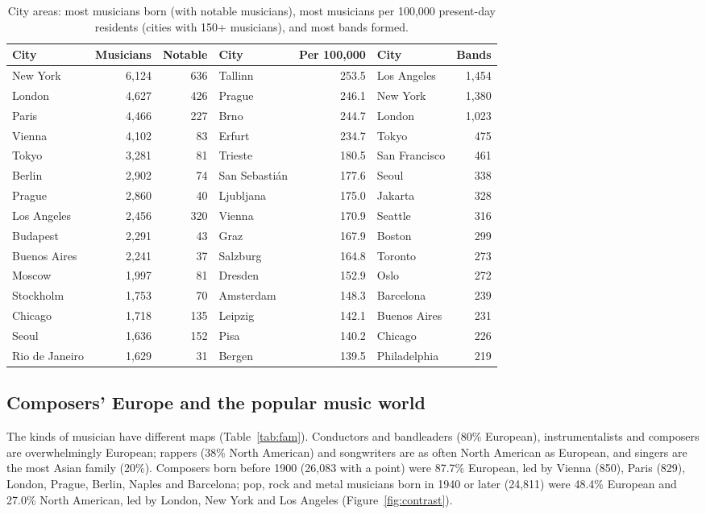 \documentclass[11pt,a4paper]{article}
\begin{document}
\begin{table}[tbp]\centering\small\caption{City areas: most musicians born (with notable musicians), most musicians per 100,000 present-day residents (cities with 150+ musicians), and most bands formed.}\label{tab:cities}\setlength{\tabcolsep}{5pt}\begin{tabular}{lrr@{\hspace{14pt}}lr@{\hspace{14pt}}lr}\toprule City & Musicians & Notable & City & Per 100,000 & City & Bands\\\midrule
New York & 6,124 & 636 & Tallinn & 253.5 & Los Angeles & 1,454\\
London & 4,627 & 426 & Prague & 246.1 & New York & 1,380\\
Paris & 4,466 & 227 & Brno & 244.7 & London & 1,023\\
Vienna & 4,102 & 83 & Erfurt & 234.7 & Tokyo & 475\\
Tokyo & 3,281 & 81 & Trieste & 180.5 & San Francisco & 461\\
Berlin & 2,902 & 74 & San Sebastián & 177.6 & Seoul & 338\\
Prague & 2,860 & 40 & Ljubljana & 175.0 & Jakarta & 328\\
Los Angeles & 2,456 & 320 & Vienna & 170.9 & Seattle & 316\\
Budapest & 2,291 & 43 & Graz & 167.9 & Boston & 299\\
Buenos Aires & 2,241 & 37 & Salzburg & 164.8 & Toronto & 273\\
Moscow & 1,997 & 81 & Dresden & 152.9 & Oslo & 272\\
Stockholm & 1,753 & 70 & Amsterdam & 148.3 & Barcelona & 239\\
Chicago & 1,718 & 135 & Leipzig & 142.1 & Buenos Aires & 231\\
Seoul & 1,636 & 152 & Pisa & 140.2 & Chicago & 226\\
Rio de Janeiro & 1,629 & 31 & Bergen & 139.5 & Philadelphia & 219\\
\bottomrule\end{tabular}\end{table}

\subsection{Composers' Europe and the popular music world}
The kinds of musician have different maps (Table~\ref{tab:fam}). Conductors and bandleaders (80\% European), instrumentalists and composers are overwhelmingly European; rappers (38\% North American) and songwriters are as often North American as European, and singers are the most Asian family (20\%). Composers born before 1900 (26,083 with a point) were 87.7\% European, led by Vienna (850), Paris (829), London, Prague, Berlin, Naples and Barcelona; pop, rock and metal musicians born in 1940 or later (24,811) were 48.4\% European and 27.0\% North American, led by London, New York and Los Angeles (Figure~\ref{fig:contrast}).
\end{document}
